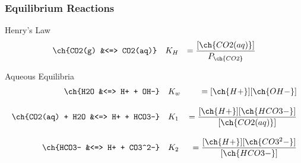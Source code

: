 \frametitle{Equilibrium Reactions}
\vspace{-0.2in}
\begin{block}{Henry's Law}
\begin{align*}
\ch{CO2(g) &<=> CO2(aq)} \quad &K_H &= \frac{[\ch{CO2(aq)}]}{P_{\ch{CO2}}}
\end{align*}
\end{block}

\begin{block}{Aqueous Equilibria}
\begin{align*}
\ch{H2O &<=> H+ + OH-} \quad &K_w &= [\ch{H+}][\ch{OH-}] \\[0.3cm]
\ch{CO2(aq) + H2O &<=> H+ + HCO3-} \quad &K_1 &= \frac{[\ch{H+}][\ch{HCO3-}]}{[\ch{CO2(aq)}]} \\[0.3cm]
\ch{HCO3- &<=> H+ + CO3^2-} \quad &K_2 &= \frac{[\ch{H+}][\ch{CO3^2-}]}{[\ch{HCO3-}]}
\end{align*}
\end{block}
